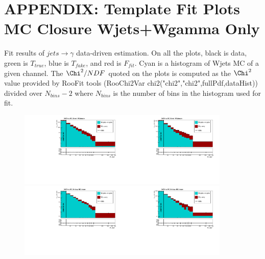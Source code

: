 \section{APPENDIX: Template Fit Plots MC Closure Wjets+Wgamma Only}
\label{sec:TemplateFitPlotsMCclosureWjetsPlusWg}

Fit results of $jets \rightarrow \gamma$ data-driven estimation. On all the plots, black is data, green is $T_{true}$, blue is $T_{fake}$, and red is $F_{fit}$. Cyan is a histogram of Wjets MC of a given channel. The $\Chi^2/{NDF}$ quoted on the plots is computed as the $\Chi^2$ value provided by RooFit tools (RooChi2Var chi2("chi2","chi2",fullPdf,dataHist)) divided over $N_{bins}-2$ where $N_{bins}$ is the number of bins in the histogram used for fit.

 \begin{figure}[htb]
  \begin{center}
   \includegraphics[width=0.45\textwidth]{../figs/figs_v11/MUON_WGamma/MCclosureWjetsPlusWg/c_TotalDATAvsMC_Barrel__phoEt_MCclosure.pdf}\includegraphics[width=0.45\textwidth]{../figs/figs_v11/ELECTRON_WGamma/MCclosureWjetsPlusWg/c_TotalDATAvsMC_Barrel__phoEt_MCclosure.pdf}
   \includegraphics[width=0.45\textwidth]{../figs/figs_v11/MUON_WGamma/MCclosureWjetsPlusWg/c_TotalDATAvsMC_Endcap__phoEt_MCclosure.pdf}\includegraphics[width=0.45\textwidth]{../figs/figs_v11/ELECTRON_WGamma/MCclosureWjetsPlusWg/c_TotalDATAvsMC_Endcap__phoEt_MCclosure.pdf}

\end{center}
\end{figure}
